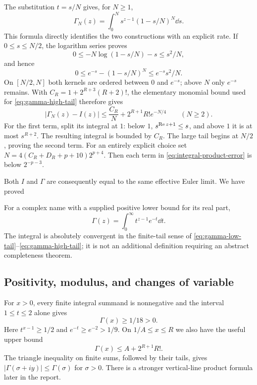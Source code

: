 The substitution $t=s/N$ gives, for $N\ge1$,
\begin{equation}
 \Gamma_N(z)=\int_0^N s^{z-1}(1-s/N)^N\dd s.
 \label{eq:gamma-euler-integral}
\end{equation}
This formula directly identifies the two constructions with an explicit
rate. If $0\le s\le N/2$, the logarithm series proves
\[
 0\le-N\log(1-s/N)-s\le s^2/N,
\]
and hence
\[
 0\le e^{-s}-(1-s/N)^N\le e^{-s}s^2/N.
\]
On $[N/2,N]$ both kernels are ordered between $0$ and $e^{-s}$;
above $N$ only $e^{-s}$ remains. With
$C_R=1+2^{R+3}(R+2)!$, the elementary monomial bound used for
\eqref{eq:gamma-high-tail} therefore gives
\begin{equation}
 \boxed{\displaystyle
 |\Gamma_N(z)-I(z)|
 \le\frac{C_R}{N}+2^{R+1}R!e^{-N/4}\qquad(N\ge2).}
 \label{eq:integral-product-error}
\end{equation}
For the first term, split its integral at $1$: below $1$,
$s^{\operatorname{Re} z+1}\le s$, and above $1$ it is at most $s^{R+2}$.
The resulting integral is bounded by $C_R$. The large tail begins at
$N/2$, proving the second term. For an entirely explicit choice set
$N=4(C_R+D_R+p+10)2^{p+4}$. Then each term in
\eqref{eq:integral-product-error} is below $2^{-p-3}$.

Both $I$ and $\Gamma$ are consequently equal to the same effective
Euler limit. We have proved
\begin{theorem}
For a complex name with a supplied positive lower bound for its real part,
\[
 \boxed{\displaystyle\Gamma(z)=\int_0^\infty t^{z-1}e^{-t}\dd t.}
\]
The integral is absolutely convergent in the finite-tail sense of
\eqref{eq:gamma-low-tail}--\eqref{eq:gamma-high-tail}; it is not an
additional definition requiring an abstract completeness theorem.
\end{theorem}

\subsection{Positivity, modulus, and changes of variable}

For $x>0$, every finite integral summand is nonnegative and the interval
$1\le t\le2$ alone gives
\begin{equation}
 \Gamma(x)\ge1/18>0.\label{eq:gamma-positive}
\end{equation}
Here $t^{x-1}\ge1/2$ and $e^{-t}\ge e^{-2}>1/9$.
On $1/A\le x\le R$ we also have the useful upper bound
\begin{equation}
 \Gamma(x)\le A+2^{R+1}R!.\label{eq:gamma-real-bound}
\end{equation}
The triangle inequality on finite sums, followed by their tails, gives
$|\Gamma(\sigma+iy)|\le\Gamma(\sigma)$ for $\sigma>0$.
There is a stronger vertical-line product formula later in the report.

